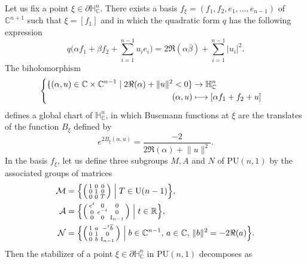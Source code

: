 \documentclass[JEP,XML,SOM,Unicode,NoEqCountersInSection,published]{cedram}
\newenvironment{Smallpmatrix}{\Big(\begin{smallmatrix}}{\end{smallmatrix}\Big)}
\newcommand\mto{\mathchoice{\longmapsto}{\mapsto}{\mapsto}{\mapsto}}
\theoremstyle{definition}
\newcommand{\C}{\mathbb{C}}
\newcommand{\R}{\mathbb{R}}
\newcommand{\HNC}{\mathbb{H}^{n}_{\C}}
\newcommand{\PHNC}{\partial\mathbb{H}^{n}_{\C}}
\newcommand{\PU}{\mathrm{PU}}
\def\C{\mathbb{C}}
\newcommand{\HNC}{\mathbb{H}^{n}_{\C}}
\newcommand{\PU}{\mathrm{PU}}
\begin{document}
Let us fix a point $\xi\in\PHNC$. There exists a basis $f_{\xi}=(f_1,f_2,e_1,\dots,e_{n-1})$ of $\C^{n+1}$ such that $\xi=[f_1]$ and in which the quadratic form $q$ has the following expression
\begin{equation*}
q\biggl(\alpha f_1+\beta f_2+\sum_{i=1}^{n-1}u_ie_i\biggr) = 2\Re(\alpha\overline{\beta}) + \sum_{i=1}^{n-1}\lvert u_i\rvert^{2}.
\end{equation*}
The biholomorphism
\begin{equation*}
\begin{cases}\begin{aligned}
\{(\alpha,u)\in \C\times\C^{n-1}\mid 2\Re(\alpha)+\lVert u\rVert^{2}<0\} &\to\HNC\\
(\alpha,u) &\mto [\alpha f_1+f_2+u]
\end{aligned}
\end{cases}
\end{equation*}
defines a global chart of $\HNC$, in which Busemann functions at $\xi$ are the translates of the function $B_{\xi}$ defined by
\begin{equation*}
e^{2B_{\xi}(\alpha,u)}=\frac{-2}{2\Re(\alpha)+\lVert u\rVert^{2}}.
\end{equation*}
In the basis $f_{\xi}$, let us define three subgroups $M,A$ and $N$ of $\PU(n,1)$ by the associated groups of matrices
\begin{align*}
\mathcal{M} &= \arraycolsep3.5pt\Bigl\{\begin{Smallpmatrix}
1&0&0\\
0&1&0\\
0&0&T
\end{Smallpmatrix}
\Bigm| T\in \mathrm{U}(n-1)\Bigr\}, \\
\mathcal{A} &= \arraycolsep3.5pt\Bigl\{\begin{Smallpmatrix}
e^{t}&0&0\\
0&e^{-t}&0\\
0&0&\mathrm{I}_{n-1}
\end{Smallpmatrix}
\Bigm| t\in \R \Bigr\}, \\
\mathcal{N} &=\arraycolsep3.5pt\Bigl\{\begin{Smallpmatrix}
1 & a & -{}^{t}\overline{b} \\
0 & 1 & 0 \\
0 & b & \mathrm{I}_{n-1}
\end{Smallpmatrix}
\Bigm| b\in \C^{n-1},\,a\in \C,\, \lVert b\rVert^{2} = -2\Re(a) \Bigr\}.
\end{align*}
Then the stabilizer of a point $\xi\in \PHNC$ in $\PU(n,1)$ decomposes as
\end{document}
